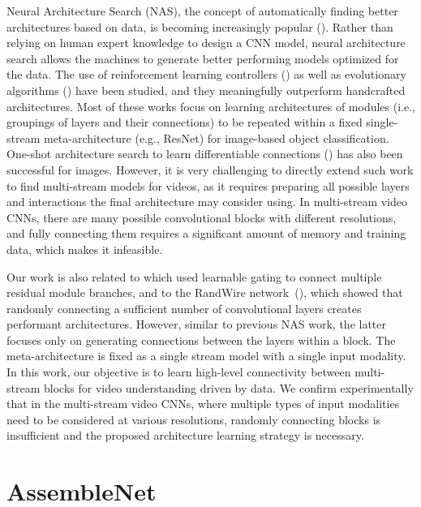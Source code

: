 \documentclass{article} \usepackage{iclr2020_conference,times}
\begin{document}
Neural Architecture Search (NAS), the concept of automatically finding better architectures based on data, is becoming increasingly popular (\citealp{zoph2017neural,zoph2018nas,liu2018progressive}). Rather than relying on human expert knowledge to design a CNN model, neural architecture search allows the machines to generate better performing models optimized for the data. The use of reinforcement learning controllers (\citealp{zoph2017neural,zoph2018nas})  as well as evolutionary algorithms (\citealp{real2019amoeba}) have been studied, and they meaningfully outperform handcrafted architectures. Most of these works focus on learning architectures of modules (i.e., groupings of layers and their connections) to be repeated within a fixed single-stream meta-architecture (e.g., ResNet) for image-based object classification. 
One-shot architecture search to learn differentiable connections (\citealp{bender2018understanding,liu2019darts}) has also been successful for images. However, it is very challenging to directly extend such work to find multi-stream models for videos, as it requires preparing all possible layers and interactions the final architecture may consider using. In multi-stream video CNNs, there are many possible convolutional blocks with different resolutions, and fully connecting them requires a significant amount of memory and training data, which makes it infeasible. 






Our work is also related to \cite{ahmed2017connectivity} which used learnable gating to connect multiple residual module branches, and to the RandWire network~(\citealp{xie2019exploring}), which showed that randomly connecting a sufficient number of convolutional layers creates performant architectures. However, similar to previous NAS work, the latter focuses only on generating connections between the layers within a block. The meta-architecture is fixed as a single stream model with a single input modality. In this work, our objective is to learn high-level connectivity between multi-stream blocks for video understanding driven by data. We confirm experimentally that in the multi-stream video CNNs, where multiple types of input modalities need to be considered at various resolutions, randomly connecting blocks is insufficient and the proposed architecture learning strategy is necessary.







\section{AssembleNet}
\end{document}
